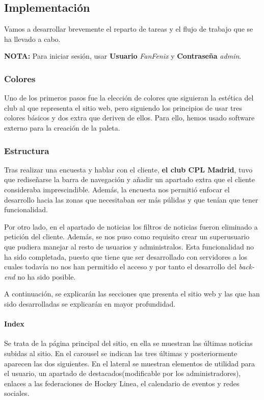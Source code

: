 \documentclass[10pt, spanish, pdftex]{template/UC3M_document}
\begin{document}
\subsection{Implementación}
Vamos a desarrollar brevemente el reparto de tareas y el flujo de trabajo que se ha llevado a cabo.

\textbf{NOTA:} Para iniciar sesión, usar \textbf{Usuario} \textit{FanFenix} y \textbf{Contraseña} \textit{admin}.

\subsubsection{Colores}\label{paleta}
Uno de los primeros pasos fue la elección de colores que siguieran la estética del club al que representa el sitio web, pero siguiendo los principios de usar tres colores básicos y dos extra que deriven de ellos. Para ello, hemos usado software externo para la creación de la paleta.

\subsubsection{Estructura}
Tras realizar una encuesta y hablar con el cliente, \textbf{el club CPL Madrid}, tuvo que rediseñarse la barra de navegación y añadir un apartado extra que el cliente consideraba imprescindible. Además, la encuesta nos permitió enfocar el desarrollo hacia las zonas que necesitaban ser más púlidas y que tenían que tener funcionalidad.

Por otro lado, en el apartado de noticias los filtros de noticias fueron eliminado a petición del cliente. Además, se nos puso como requisito crear un superusuario que pudiera manejar al resto de usuarios y administralos. Esta funcionalidad no ha sido completada, puesto que tiene que ser desarrollado con servidores a los cuales todavía no nos han permitido el acceso y por tanto el desarrollo del \textit{back-end} no ha sido posible.

A continuación, se explicarán las secciones que presenta el sitio web y las que han sido desarrolladas se explicarán en mayor profundidad.

\paragraph{Index}
Se trata de la página principal del sitio, en ella se muestran las últimas noticias subidas al sitio. En el carousel se indican las tres últimas y posteriormente aparecen las dos siguientes.
En el lateral se muestran elementos de utilidad para el usuario, un apartado de destacados(modificable por los administradores), enlaces a las federaciones de Hockey Linea, el calendario de eventos y redes sociales.
\end{document}

